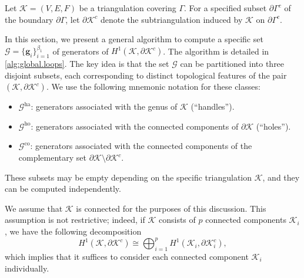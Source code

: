 \documentclass[a4paper,twoside,10pt]{article}
\theoremstyle{plain}
\theoremstyle{definition}
\theoremstyle{remark}
\newcommand{\mc}{\mathcal}
\newcommand{\K}{\mc{K}}
\newcommand{\cochain}[1]{\mathbf #1}
\newcommand{\ha}{\mathrm{ha}}
\newcommand{\ho}{\mathrm{ho}}
\newcommand{\co}{\mathrm{co}}
\begin{document}
Let $\K= (V, E, F)$ be a triangulation covering $\Gamma$.
For a specified subset $\partial \Gamma^c$ of the boundary $\partial \Gamma$, let $\partial \K^c$ denote the subtriangulation induced by $\K$ on $\partial \Gamma^c$.

In this section, we present a general algorithm to compute a specific set $\mc G = \{\cochain g_i \}_{i=1}^{\beta_1}$ of generators of $H^1(\K, \partial \K^c)$.
The algorithm is detailed in \cref{alg:global.loops}.
The key idea is that the set $\mc G$ can be partitioned into three disjoint subsets, each corresponding to distinct topological features of the pair $(\K, \partial \K^c)$.
We use the following mnemonic notation for these classes:
\begin{itemize}
    \item $\mc G^\ha$: generators associated with the genus of $\K$ (``handles'').
\item $\mc G^\ho$: generators associated with the connected components of $\partial \K$ (``holes'').
\item $\mc G^\co$: generators associated with the connected components of the complementary set $\partial \K \setminus \partial \K^c$.
\end{itemize}
These subsets may be empty depending on the specific triangulation $\K$, and they can be computed independently.

We assume that $\mc K$ is connected for the purposes of this discussion. This assumption is not restrictive;
indeed, if $\K$ consists of $p$ connected components $\K_i$, we have the following decomposition
\[
H^1(\K, \partial \K^c) \cong \bigoplus_{i=1}^p H^1(\K_i, \partial \K_i^c),
\]
which implies that it suffices to consider each connected component $\K_i$ individually.
\end{document}
